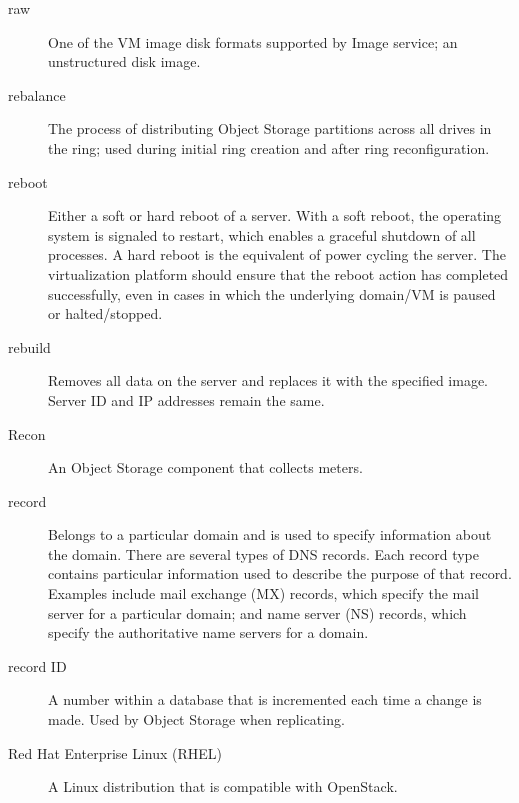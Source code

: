\documentclass[letterpaper,10pt,english]{sphinxmanual}
\begin{document}
\begin{description}
\item[{raw}] \leavevmode{}\label{_source/glossary:term-raw}
One of the VM image disk formats supported by Image service; an
unstructured disk image.

\item[{rebalance}] \leavevmode{}\label{_source/glossary:term-rebalance}
The process of distributing Object Storage partitions across all
drives in the ring; used during initial ring creation and after ring
reconfiguration.

\item[{reboot}] \leavevmode{}\label{_source/glossary:term-reboot}
Either a soft or hard reboot of a server. With a soft reboot,
the operating system is signaled to restart, which enables a graceful
shutdown of all processes. A hard reboot is the equivalent of power
cycling the server. The virtualization platform should ensure that the
reboot action has completed successfully, even in cases in which the
underlying domain/VM is paused or halted/stopped.

\item[{rebuild}] \leavevmode{}\label{_source/glossary:term-rebuild}
Removes all data on the server and replaces it with the
specified image. Server ID and IP addresses remain the same.

\item[{Recon}] \leavevmode{}\label{_source/glossary:term-recon}
An Object Storage component that collects meters.

\item[{record}] \leavevmode{}\label{_source/glossary:term-record}
Belongs to a particular domain and is used to specify
information about the domain.
There are several types of DNS records. Each record type contains
particular information used to describe the purpose of that record.
Examples include mail exchange (MX) records, which specify the mail
server for a particular domain; and name server (NS) records, which
specify the authoritative name servers for a domain.

\item[{record ID}] \leavevmode{}\label{_source/glossary:term-record-id}
A number within a database that is incremented each time a
change is made. Used by Object Storage when replicating.

\item[{Red Hat Enterprise Linux (RHEL)}] \leavevmode{}\label{_source/glossary:term-red-hat-enterprise-linux-rhel}
A Linux distribution that is compatible with OpenStack.


\end{description}
\end{document}
